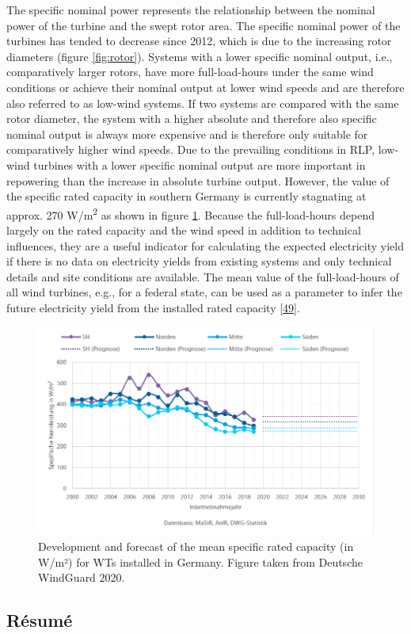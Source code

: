 \documentclass[a4paper,11pt]{article}
\begin{document}
The specific nominal power represents the relationship between the nominal power of the turbine and the swept rotor area. The specific nominal power of the turbines has tended to decrease since 2012, which is due to the increasing rotor diameters (figure \ref{fig:rotor}). Systems with a lower specific nominal output, i.e., comparatively larger rotors, have more full-load-hours under the same wind conditions or achieve their nominal output at lower wind speeds and are therefore also referred to as low-wind systems. If two systems are compared with the same rotor diameter, the system with a higher absolute and therefore also specific nominal output is always more expensive and is therefore only suitable for comparatively higher wind speeds. Due to the prevailing conditions in RLP, low-wind turbines with a lower specific nominal output are more important in repowering than the increase in absolute turbine output. However, the value of the specific rated capacity in southern Germany is currently stagnating at approx. 270 W/m\textsuperscript{2} as shown in figure \ref{fig:spec}. Because the full-load-hours depend largely on the rated capacity and the wind speed in addition to technical influences, they are a useful indicator for calculating the expected electricity yield if there is no data on electricity yields from existing systems and only technical details and site conditions are available. The mean value of the full-load-hours of all wind turbines, e.g., for a federal state, can be used as a parameter to infer the future electricity yield from the installed rated capacity {[}\protect\hyperlink{ref-RasmusBorrmannDr.KnudRehfeldtDr.DennisKruse.2020}{49}{]}.
\begin{figure}[H]

{\centering \includegraphics[width=1\linewidth]{figures/DWG/DWG_Spezifische_Nennleistung} 

}

\caption{Development and forecast of the mean specific rated capacity (in W/m²) for WTs installed in Germany. Figure taken from Deutsche WindGuard 2020.}\label{fig:spec}
\end{figure}
\hypertarget{ruxe9sumuxe9}{%
\subsection{Résumé}\label{ruxe9sumuxe9}}
\end{document}
